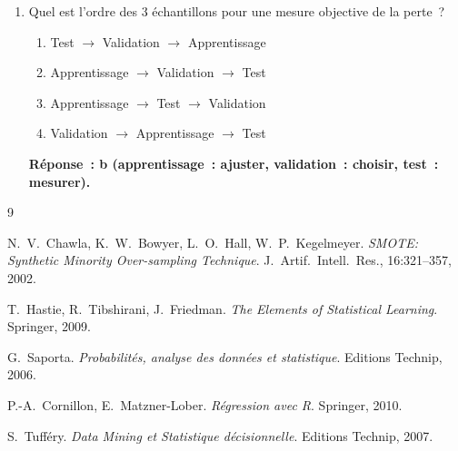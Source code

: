 \documentclass[a4paper,11pt]{article}
\theoremstyle{definition}
\theoremstyle{remark}
\begin{document}
\begin{enumerate}
  \item Quel est l'ordre des 3 \'echantillons pour une mesure
    objective de la perte~?
    \begin{enumerate}
      \item Test $\to$ Validation $\to$ Apprentissage
      \item Apprentissage $\to$ Validation $\to$ Test
      \item Apprentissage $\to$ Test $\to$ Validation
      \item Validation $\to$ Apprentissage $\to$ Test
    \end{enumerate}
    \textbf{R\'eponse~: b (apprentissage~: ajuster, validation~:
    choisir, test~: mesurer).}

\end{enumerate}

\begin{thebibliography}{9}

  N.~V.~Chawla, K.~W.~Bowyer, L.~O.~Hall, W.~P.~Kegelmeyer.
  \newblock \emph{SMOTE: Synthetic Minority Over-sampling Technique}.
  \newblock J.~Artif.~Intell.~Res., 16:321--357, 2002.

  T.~Hastie, R.~Tibshirani, J.~Friedman.
  \newblock \emph{The Elements of Statistical Learning}.
  \newblock Springer, 2009.

  G.~Saporta.
  \newblock \emph{Probabilit\'es, analyse des donn\'ees et
    statistique}.
  \newblock Editions Technip, 2006.

  P.-A.~Cornillon, E.~Matzner-Lober.
  \newblock \emph{R\'egression avec R}.
  \newblock Springer, 2010.

  S.~Tuff\'ery.
  \newblock \emph{Data Mining et Statistique d\'ecisionnelle}.
  \newblock Editions Technip, 2007.

\end{thebibliography}
\end{document}

